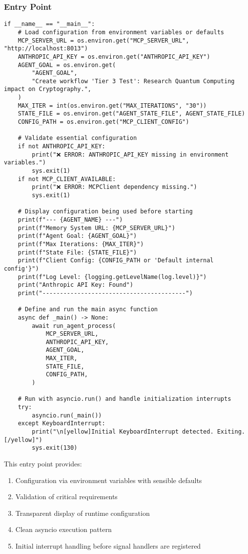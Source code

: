 \documentclass[12pt,a4paper]{article}
\begin{document}
\subsubsection*{Entry Point}
\begin{pageablecode}
\begin{verbatim}
if __name__ == "__main__":
    # Load configuration from environment variables or defaults
    MCP_SERVER_URL = os.environ.get("MCP_SERVER_URL", "http://localhost:8013")
    ANTHROPIC_API_KEY = os.environ.get("ANTHROPIC_API_KEY")
    AGENT_GOAL = os.environ.get(
        "AGENT_GOAL",
        "Create workflow 'Tier 3 Test': Research Quantum Computing impact on Cryptography.",
    )
    MAX_ITER = int(os.environ.get("MAX_ITERATIONS", "30"))
    STATE_FILE = os.environ.get("AGENT_STATE_FILE", AGENT_STATE_FILE)
    CONFIG_PATH = os.environ.get("MCP_CLIENT_CONFIG")

    # Validate essential configuration
    if not ANTHROPIC_API_KEY:
        print("❌ ERROR: ANTHROPIC_API_KEY missing in environment variables.")
        sys.exit(1)
    if not MCP_CLIENT_AVAILABLE:
        print("❌ ERROR: MCPClient dependency missing.")
        sys.exit(1)

    # Display configuration being used before starting
    print(f"--- {AGENT_NAME} ---")
    print(f"Memory System URL: {MCP_SERVER_URL}")
    print(f"Agent Goal: {AGENT_GOAL}")
    print(f"Max Iterations: {MAX_ITER}")
    print(f"State File: {STATE_FILE}")
    print(f"Client Config: {CONFIG_PATH or 'Default internal config'}")
    print(f"Log Level: {logging.getLevelName(log.level)}")
    print("Anthropic API Key: Found")
    print("-----------------------------------------")

    # Define and run the main async function
    async def _main() -> None:
        await run_agent_process(
            MCP_SERVER_URL,
            ANTHROPIC_API_KEY,
            AGENT_GOAL,
            MAX_ITER,
            STATE_FILE,
            CONFIG_PATH,
        )

    # Run with asyncio.run() and handle initialization interrupts
    try:
        asyncio.run(_main())
    except KeyboardInterrupt:
        print("\n[yellow]Initial KeyboardInterrupt detected. Exiting.[/yellow]")
        sys.exit(130)
\end{verbatim}
\end{pageablecode}
This entry point provides:
\begin{enumerate}[label=\arabic*.]
    \item Configuration via environment variables with sensible defaults
    \item Validation of critical requirements
    \item Transparent display of runtime configuration
    \item Clean asyncio execution pattern
    \item Initial interrupt handling before signal handlers are registered
\end{enumerate}
\end{document}
